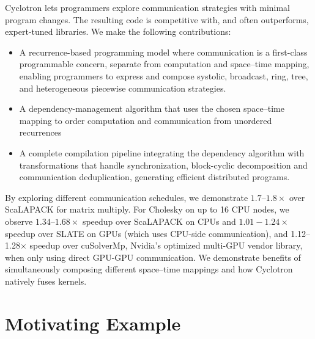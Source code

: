 \documentclass[sigplan, nonacm]{acmart}
\begin{document}
Cyclotron lets programmers explore communication strategies with minimal program changes. The resulting code is competitive with, and often outperforms, expert-tuned libraries. We make the following contributions:
\begin{itemize}
  \item A recurrence-based programming model where communication is a first-class programmable concern, separate from computation and space--time mapping, enabling programmers to express and compose systolic, broadcast, ring, tree, and heterogeneous piecewise communication strategies.
  \item A dependency-management algorithm that uses the chosen space--time mapping to order computation and communication from unordered recurrences
  \item A complete compilation pipeline integrating the dependency algorithm with transformations that handle synchronization, block-cyclic decomposition and communication deduplication, generating efficient distributed programs.
\end{itemize}

By exploring different communication schedules, 
we demonstrate $1.7$--$1.8\times$ over ScaLAPACK for matrix multiply.
For Cholesky on up to 16 CPU nodes, we observe  $1.34$--$1.68\times$  speedup over ScaLAPACK  on CPUs
and $1.01-1.24 \times$ speedup over SLATE on GPUs (which uses CPU-side communication), and 1.12--1.28$\times$ speedup over cuSolverMp, Nvidia's optimized multi-GPU vendor library, when only using direct GPU-GPU communication. We demonstrate benefits of simultaneously composing different space--time mappings and how Cyclotron natively fuses kernels.


\section{Motivating Example}
\label{sec:motivation}
\label{sec:cholesky}
\end{document}
